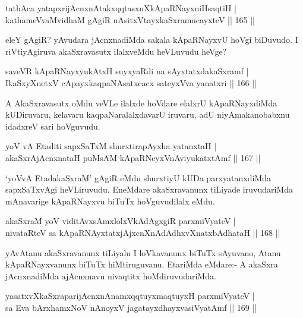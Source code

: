 \begin{shl}
tathAca yatapxrijAcnxnAtakxqqtasxnXkApaRNayxniHsaqtiH |\\
kathameVvaMvidhaM gAgiR nAsitxVtayxkaSxramucayxteV \hfill || 165 ||
\end{shl}

\begin{artha}
eleY gAgiR? yAvudara jAcnxnadiMda sakala kApaRNayxvU hoVgi biDuvudo. I riVtiyAgiruva akaSxravasutx ilalxveMdu heVLuvudu heVge?
\end{artha}

\begin{shl}
saveVR kApaRNayxyukAtxH suyxyaRdi na sAyxtatxdakaSxramf |\\
IkaSxyXnetxV cApayxkaqpaNAsatxcacx sateyxVva yanatxri \hfill || 166 ||
\end{shl}

\begin{artha}
A AkaSxravasutx oMdu veVLe ilalxde hoVdare elalxrU kApaRNayxdiMda kUDiruvaru, kelavaru kaqpaNaralalxdavarU iruvaru, adU niyAmakanobabxnu idadxreV sari hoVguvudu.
\end{artha}

\begin{shl}
yoV vA Etaditi sapxSaTxM shurxtirapAyxha yatanxtaH |\\
akaSxrAjAcnxnataH puMsAM kApaRNeyxVnAviyukatxtAmf \hfill || 167 ||
\end{shl}

\begin{artha}
`yoVvA EtadakaSxraM' gAgiR eMdu shurxtiyU kUDa parxyatanxdiMda sapxSaTxvAgi heVLiruvudu. EneMdare akaSxravanunx tiLiyade iruvudariMda mAnavarige kApaRNayxvu biTuTx hoVguvudilalx eMdu.
\end{artha}

\begin{shl}
akaSxraM yoV viditAvx\s sAmxlolxVkAdAgxgiR parxmiVyateV |\\
nivataRteV sa kApaRNAyxtatxjAjxcnXnAdAdhxvXnatxbAdhataH \hfill || 168 ||
\end{shl}

\begin{artha}%
yAvAtanu akaSxravanunx tiLiyalu I loVkavanunx biTuTx sAyuvano, Atanu kApaRNayxvanunx biTuTx hiMtiruguvanu. EtariMda eMdare:- A akaSxra jAcnxnadiMda ajAcnxnavu nivaqtitx hoMdiruvudariMda.
\end{artha}

\begin{shl}
yasatxvXkaSxraparijAcnxnAnamxqqtuyxmaqtuyxH parxmiVyateV |\\
sa Eva bArxhamxNoV nAnoyxV jagatayxdhayxvasiVyatAmf \hfill || 169 ||
\end{shl}

